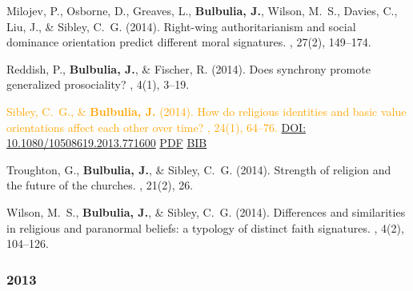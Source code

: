 \documentclass{article}
\begin{document}
\begin{thebibliography}{99}
Milojev, P., Osborne, D., Greaves, L., {\bf Bulbulia, J.}, Wilson, M.~S., Davies, C., Liu, J., \& Sibley, C.~G. (2014).
\newblock Right-wing authoritarianism and social dominance orientation predict
  different moral signatures.
, 27(2), 149--174. 


Reddish, P., {\bf Bulbulia, J.}, \& Fischer, R. (2014).
\newblock Does synchrony promote generalized prosociality?
, 4(1), 3--19. 


\textcolor{Orange}{Sibley, C.~G., \& {\bf Bulbulia, J.} (2014). 
\newblock How do religious identities and basic value orientations affect each
  other over time?
,
  24(1), 64--76. 
\href{https://doi.org/10.1080/10508619.2013.771600}{DOI: 10.1080/10508619.2013.771600}}
\href{https://www.dropbox.com/s/h7gqktxwjc5z11p/10508619.2013.pdf}{PDF} 
\href{https://www.dropbox.com/s/9blm1acufkd2jrv/tandf_hjpr2024_64.bib}{BIB}


Troughton, G., {\bf Bulbulia, J.}, \& Sibley, C.~G. (2014).
\newblock Strength of religion and the future of the churches.
, 21(2), 26.


Wilson, M.~S., {\bf Bulbulia, J.}, \& Sibley, C.~G. (2014).
\newblock Differences and similarities in religious and paranormal beliefs: a
  typology of distinct faith signatures.
, 4(2), 104--126. 



\subsubsection*{2013} 




\end{thebibliography}
\end{document}
